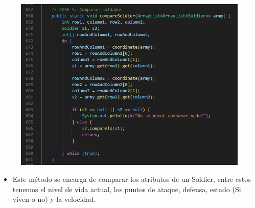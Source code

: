 \documentclass{article}
\begin{document}
	\begin{figure}[H]
		\centering
		\includegraphics[width=1\textwidth,keepaspectratio]{img/compareSoldier.jpg}
	\end{figure}
	
	\begin{itemize}	
		\item Este método se encarga de comparar los atributos de un Soldier, entre estos tenemos el nivel de vida actual, los puntos de ataque, defensa, estado (Si viven o no) y la velocidad.
	\end{itemize}
	
\end{document}
